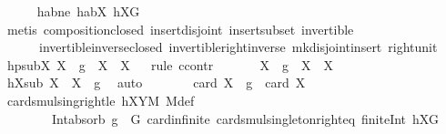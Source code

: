 \begin{isabellebody}
\ \ \ \ \isamarkupfalse%
\ habne\ habX\ hXG\ \isamarkupfalse%
\ {\isacharparenleft}{\kern0pt}metis\ composition{\isacharunderscore}{\kern0pt}closed\ insert{\isacharunderscore}{\kern0pt}disjoint{\isacharparenleft}{\kern0pt}{}{\isacharparenright}{\kern0pt}\ insert{\isacharunderscore}{\kern0pt}subset\ invertible\ \isanewline
\ \ \ \ \ \ invertible{\isacharunderscore}{\kern0pt}inverse{\isacharunderscore}{\kern0pt}closed\ invertible{\isacharunderscore}{\kern0pt}right{\isacharunderscore}{\kern0pt}inverse{}\ mk{\isacharunderscore}{\kern0pt}disjoint{\isacharunderscore}{\kern0pt}insert\ right{\isacharunderscore}{\kern0pt}unit{\isacharparenright}{\kern0pt}\isanewline
\ \ \isamarkupfalse%
\ hpsubX{\isacharcolon}{\kern0pt}\ {\isachardoublequoteopen}{\isacharparenleft}{\kern0pt}X\ {\isasymcdots}\ {\isacharbraceleft}{\kern0pt}g{\isacharbraceright}{\kern0pt}{\isacharparenright}{\kern0pt}\ {\isasyminter}\ X\ {\isasymsubset}\ X{\isachardoublequoteclose}\isanewline
\ \ \isamarkupfalse%
{\isacharparenleft}{\kern0pt}rule\ ccontr{\isacharparenright}{\kern0pt}\isanewline
\ \ \ \ \isamarkupfalse%
\ {\isachardoublequoteopen}{\isasymnot}\ {\isacharparenleft}{\kern0pt}X\ {\isasymcdots}\ {\isacharbraceleft}{\kern0pt}g{\isacharbraceright}{\kern0pt}{\isacharparenright}{\kern0pt}\ {\isasyminter}\ X\ {\isasymsubset}\ X{\isachardoublequoteclose}\isanewline
\ \ \ \ \isamarkupfalse%
\ \isamarkupfalse%
\ hXsub{\isacharcolon}{\kern0pt}\ {\isachardoublequoteopen}X\ {\isasymsubseteq}\ X\ {\isasymcdots}\ {\isacharbraceleft}{\kern0pt}g{\isacharbraceright}{\kern0pt}{\isachardoublequoteclose}\ \isamarkupfalse%
\ auto\isanewline
\ \ \ \ \isamarkupfalse%
\ \isamarkupfalse%
\ {\isachardoublequoteopen}card\ X\ {\isasymcdots}\ {\isacharbraceleft}{\kern0pt}g{\isacharbraceright}{\kern0pt}\ {\isacharequal}{\kern0pt}\ card\ X{\isachardoublequoteclose}\ \isamarkupfalse%
\ card{\isacharunderscore}{\kern0pt}smul{\isacharunderscore}{\kern0pt}sing{\isacharunderscore}{\kern0pt}right{\isacharunderscore}{\kern0pt}le\ hXYM\ M{\isacharunderscore}{\kern0pt}def\ \isanewline
\ \ \ \ \ \ \ \ Int{\isacharunderscore}{\kern0pt}absorb{}\ {\isacartoucheopen}g\ {\isasymin}\ G{\isacartoucheclose}\ card{\isachardot}{\kern0pt}infinite\ card{\isacharunderscore}{\kern0pt}smul{\isacharunderscore}{\kern0pt}singleton{\isacharunderscore}{\kern0pt}right{\isacharunderscore}{\kern0pt}eq\ finite{\isacharunderscore}{\kern0pt}Int\ hXG\ \isamarkupfalse%

\end{isabellebody}
